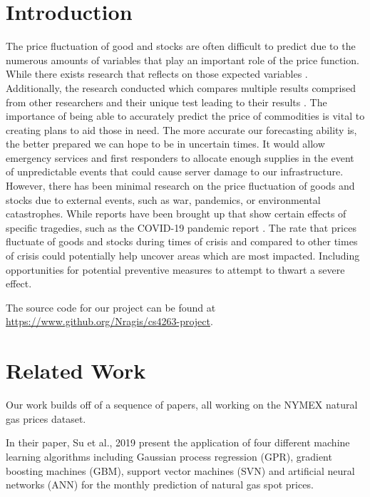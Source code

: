 \documentclass[final]{cvpr}
\begin{document}
\section{Introduction}

    The price fluctuation of good and stocks are often difficult to predict due
    to the numerous amounts of variables that play an important role of the
    price function. While there exists research that reflects on those expected
    variables \cite{romero}. Additionally, the research conducted which compares
    multiple results comprised from other researchers and their unique test
    leading to their results \cite{srivastava}.  The importance of being able to
    accurately predict the price of commodities is vital to creating plans to
    aid those in need. The more accurate our forecasting ability is, the better
    prepared we can hope to be in uncertain times. It would allow emergency
    services and first responders to allocate enough supplies in the event of
    unpredictable events that could cause server damage to our infrastructure.
    However, there has been minimal research on the price fluctuation of goods
    and stocks due to external events, such as war, pandemics, or environmental
    catastrophes. While reports have been brought up that show certain effects
    of specific tragedies, such as the COVID-19 pandemic report \cite{mead}. The
    rate that prices fluctuate of goods and stocks during times of crisis and
    compared to other times of crisis could potentially help uncover areas which
    are most impacted. Including opportunities for potential preventive measures
    to attempt to thwart a severe effect.

    The source code for our project can be found at 
    \url{https://www.github.org/Nragis/cs4263-project}.

\section{Related Work}

    Our work builds off of a sequence of papers, all working on the NYMEX 
    natural gas prices dataset. 
    
    In their paper, Su et al., 2019 \cite{su} present the application of four 
    different machine learning algorithms including Gaussian process regression
    (GPR), gradient boosting machines (GBM), support vector machines (SVN) and 
    artificial neural networks (ANN) for the monthly prediction of natural
    gas spot prices.
\end{document}

